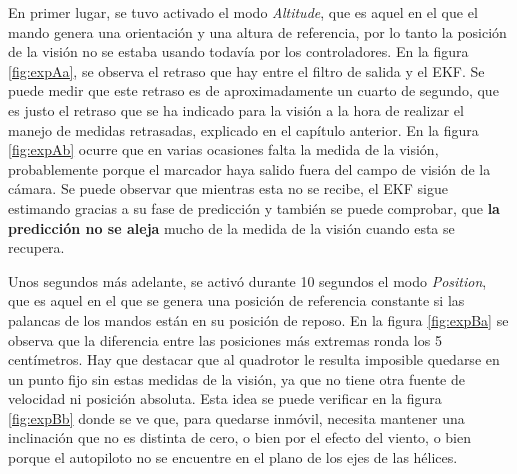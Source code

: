 En primer lugar, se tuvo activado el modo \textit{Altitude}, que es aquel en el que el mando genera una orientación y una altura de referencia, por lo tanto la posición de la visión no se estaba usando todavía por los controladores. En la figura \ref{fig:expAa}, se observa el retraso que hay entre el filtro de salida y el EKF. Se puede medir que este retraso es de aproximadamente un cuarto de segundo, que es justo el retraso que se ha indicado para la visión a la hora de realizar el manejo de medidas retrasadas, explicado en el capítulo anterior. En la figura \ref{fig:expAb} ocurre que en varias ocasiones falta la medida de la visión, probablemente porque el marcador haya salido fuera del campo de visión de la cámara. Se puede observar que mientras esta no se recibe, el EKF sigue estimando gracias a su fase de predicción y también se puede comprobar, que \textbf{la predicción no se aleja} mucho de la medida de la visión cuando esta se recupera.

Unos segundos más adelante, se activó durante 10 segundos el modo \textit{Position}, que es aquel en el que se genera una posición de referencia constante si las palancas de los mandos están en su posición de reposo. En la figura \ref{fig:expBa} se observa que la diferencia entre las posiciones más extremas ronda los 5 centímetros. Hay que destacar que al quadrotor le resulta imposible quedarse en un punto fijo sin estas medidas de la visión, ya que no tiene otra fuente de velocidad ni posición absoluta. Esta idea se puede verificar en la figura \ref{fig:expBb} donde se ve que, para quedarse inmóvil, necesita mantener una inclinación que no es distinta de cero, o bien por el efecto del viento, o bien porque el autopiloto no se encuentre en el plano de los ejes de las hélices. 


\figExpA
\figExpB
\figVuelo

\endinput
